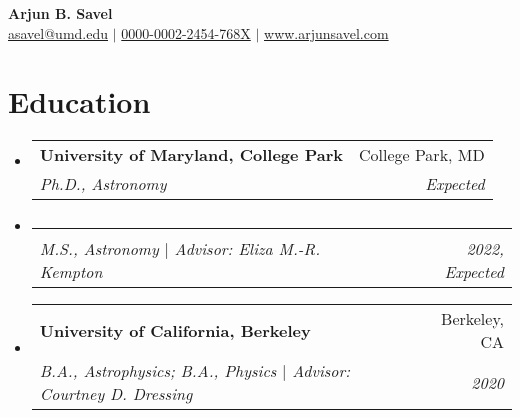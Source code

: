 \documentclass[letterpaper,12pt]{article}
\makeatletter
\newcommand{\resumeItem}[2]{
  \item\small{
    \textbf{#1}{#2 \vspace{-2pt}}
  }
}
\newcommand{\resumeItemNoBullet}[2]{
  \item[]\small{
    \hspace{-9pt}\textbf{#1}{: #2 \vspace{-6pt}}
  }
}
\newcommand{\resumeSubheading}[4]{
  \vspace{-1pt}\item[]
  \begin{tabular*}{0.98\textwidth}{l@{\extracolsep{\fill}}r}
      \hspace{-10pt}\textbf{#1} & #2 \\
      \hspace{-10pt}\textit{\small#3} & \textit{\small #4} \\
    \end{tabular*}\vspace{-5pt}
}
\newcommand{\resumeSubHeadingListStart}{\begin{itemize}[leftmargin=*]}
\newcommand{\resumeSubHeadingListEnd}{\end{itemize}}
\newcommand{\resumeItemListStart}{\begin{itemize}}
\newcommand{\shorterSection}[1]{\vspace{-10pt}\section{#1}}
\makeatother
\begin{document}
\thispagestyle{empty}

\begin{center}
  \small \textbf{\large Arjun B. Savel} \\
  \textsf{\small \href{href="mailto:asavel@umd.edu"}{asavel@umd.edu}} $\vert$   \href{https://orcid.org/0000-0002-2454-768X/}{0000-0002-2454-768X} $\vert$ \href{www.arjunsavel.com}{www.arjunsavel.com} 
\end{center}
\vspace{-20pt}
\shorterSection{Education}
  \resumeSubHeadingListStart
    \resumeSubheading
      {University of Maryland, College Park}{College Park, MD}
      {Ph.D., Astronomy}{Expected}{
    }
    \vspace{-37pt}
    \resumeSubheading
    {}{}{M.S., Astronomy $\vert$ Advisor: Eliza M.-R. Kempton}{2022, Expected}{
    }
    \vspace{-20pt}
    \resumeSubheading
      {University of California, Berkeley}{Berkeley, CA}
      {B.A., Astrophysics; B.A., Physics $\vert$ Advisor: Courtney D. Dressing}{2020}{
    }
    
  \resumeSubHeadingListEnd
  
 
\vspace{-12pt}
\end{document}
